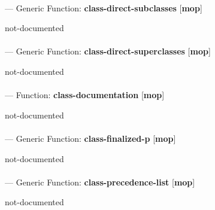 \paragraph{}
\label{MOP:CLASS-DIRECT-SUBCLASSES}
--- Generic Function: \textbf{class-direct-subclasses} [\textbf{mop}] \textit{}

\begin{adjustwidth}{5em}{5em}
not-documented
\end{adjustwidth}

\paragraph{}
\label{MOP:CLASS-DIRECT-SUPERCLASSES}
--- Generic Function: \textbf{class-direct-superclasses} [\textbf{mop}] \textit{}

\begin{adjustwidth}{5em}{5em}
not-documented
\end{adjustwidth}

\paragraph{}
\label{MOP:CLASS-DOCUMENTATION}
--- Function: \textbf{class-documentation} [\textbf{mop}] \textit{}

\begin{adjustwidth}{5em}{5em}
not-documented
\end{adjustwidth}

\paragraph{}
\label{MOP:CLASS-FINALIZED-P}
--- Generic Function: \textbf{class-finalized-p} [\textbf{mop}] \textit{}

\begin{adjustwidth}{5em}{5em}
not-documented
\end{adjustwidth}

\paragraph{}
\label{MOP:CLASS-PRECEDENCE-LIST}
--- Generic Function: \textbf{class-precedence-list} [\textbf{mop}] \textit{}

\begin{adjustwidth}{5em}{5em}
not-documented
\end{adjustwidth}

